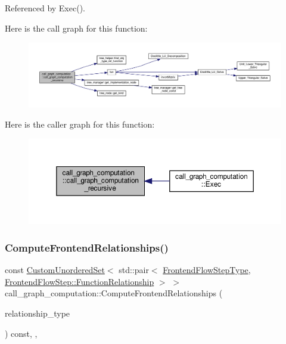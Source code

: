 Referenced by Exec().

Here is the call graph for this function\+:
\nopagebreak
\begin{figure}[H]
\begin{center}
\leavevmode
\includegraphics[width=350pt]{d3/d6f/classcall__graph__computation_aa08581de981bf5549768d841274af95c_cgraph}
\end{center}
\end{figure}
Here is the caller graph for this function\+:
\nopagebreak
\begin{figure}[H]
\begin{center}
\leavevmode
\includegraphics[width=350pt]{d3/d6f/classcall__graph__computation_aa08581de981bf5549768d841274af95c_icgraph}
\end{center}
\end{figure}
\mbox{\label{classcall__graph__computation_a65af3a72351009e38a143bd50b60bb21}} 
\subsubsection{\texorpdfstring{Compute\+Frontend\+Relationships()}{ComputeFrontendRelationships()}}
{\footnotesize\ttfamily const \hyperlink{classCustomUnorderedSet}{Custom\+Unordered\+Set}$<$ std\+::pair$<$ \hyperlink{frontend__flow__step_8hpp_afeb3716c693d2b2e4ed3e6d04c3b63bb}{Frontend\+Flow\+Step\+Type}, \hyperlink{classFrontendFlowStep_af7cf30f2023e5b99e637dc2058289ab0}{Frontend\+Flow\+Step\+::\+Function\+Relationship} $>$ $>$ call\+\_\+graph\+\_\+computation\+::\+Compute\+Frontend\+Relationships (\begin{DoxyParamCaption}\item[{const \hyperlink{classDesignFlowStep_a723a3baf19ff2ceb77bc13e099d0b1b7}{Design\+Flow\+Step\+::\+Relationship\+Type}}]{relationship\+\_\+type }\end{DoxyParamCaption}) const\hspace{0.3cm}{\ttfamily [override]}, {\ttfamily [private]}, {\ttfamily [virtual]}}



